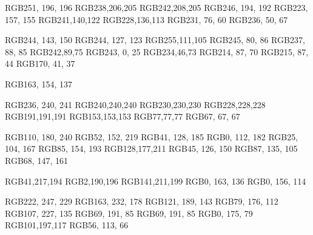 \definecolor{azalea}RGB{251, 196, 196}
\definecolor{oyster_pink}RGB{238,206,205} 
\definecolor{coral_candy}RGB{242,208,205} 
\definecolor{baby_pink}RGB{246, 194, 192}
\definecolor{petite_orchid}RGB{223, 157, 155}
\definecolor{apricot}RGB{241,140,122}
\definecolor{NY_pink}RGB{228,136,113}
\definecolor{carmine_pink}RGB{231, 76, 60}
\definecolor{deep_carmine_pink}RGB{236, 50, 67}

\definecolor{wewak}RGB{244, 143, 150}
\definecolor{light_coral}RGB{244, 127, 123}
\definecolor{bittersweet}RGB{255,111,105}
\definecolor{carnation}RGB{245, 80, 86}
\definecolor{flamingo}RGB{237, 88, 85}
\definecolor{sunset_orange}RGB{242,89,75}
\definecolor{ku_crimson}RGB{243, 0, 25}
\definecolor{amaranth}RGB{234,46,73}
\definecolor{valencia}RGB{214, 87, 70}
\definecolor{chilean_fire}RGB{215, 87, 44}
\definecolor{mexican_red}RGB{170, 41, 37}



\definecolor{napa}RGB{163, 154, 137}

\definecolor{athens_gray}RGB{236, 240, 241}
\definecolor{gallery}RGB{240,240,240}
\definecolor{mercury}RGB{230,230,230}
\definecolor{platinum}RGB{228,228,228}
\definecolor{silver}RGB{191,191,191}
\definecolor{aluminum}RGB{153,153,153}
\definecolor{ship_gray}RGB{77,77,77}
\definecolor{tuatara}RGB{67, 67, 67}

\definecolor{malibu}RGB{110, 180, 240}
\definecolor{celestial_blue}RGB{52, 152, 219}
\definecolor{curious_blue}RGB{41, 128, 185}
\definecolor{french_blue}RGB{0, 112, 182}
\definecolor{matisse}RGB{25, 104, 167}
\definecolor{shakespeare}RGB{85, 154, 193}
\definecolor{seagull}RGB{128,177,211}
\definecolor{jelly_bean}RGB{45, 126, 150}
\definecolor{venice_blue}RGB{87, 135, 105}
\definecolor{boston_blue}RGB{68, 147, 161}

\definecolor{turquoise}RGB{41,217,194}
\definecolor{java}RGB{2,190,196}
\definecolor{riptide}RGB{141,211,199}
\definecolor{mountain_meadow}RGB{0, 163, 136}
\definecolor{free_speech_aquamarine}RGB{0, 156, 114}

\definecolor{cosmic_latte}RGB{222, 247, 229}
\definecolor{chinook}RGB{163, 232, 178}
\definecolor{padua}RGB{121, 189, 143}
\definecolor{ocean_green}RGB{79, 176, 112}
\definecolor{pastel_green}RGB{107, 227, 135}
\definecolor{chateau_green}RGB{69, 191, 85}
\definecolor{RoyalBlue}RGB{69, 191, 85}
\definecolor{pigment_green}RGB{0, 175, 79}
\definecolor{fern}RGB{101,197,117}
\definecolor{killarney}RGB{56, 113, 66}
